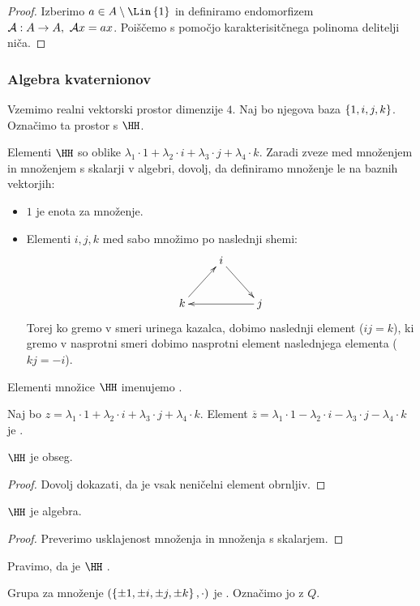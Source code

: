\begin{proof}
    Izberimo $a \in A \setminus \Lin \set{1}$ in definiramo endomorfizem $\mathcal{A}: A \to A, \ \mathcal{A}x = ax$. Poiščemo s pomočjo karakterisitčnega polinoma delitelji niča.
\end{proof}

\subsubsection*{Algebra kvaternionov}
\begin{primer}
    Vzemimo realni vektorski prostor dimenzije $4$. Naj bo njegova baza $\left\{1, i, j, k\right\}$. Označimo ta prostor s $\HH$.
    
    Elementi $\HH$ so oblike $\lambda_1 \cdot 1 + \lambda_2 \cdot i + \lambda_3 \cdot j + \lambda_4 \cdot k$. Zaradi zveze med množenjem in množenjem s skalarji v algebri, dovolj, da definiramo množenje le na baznih vektorjih:
    \begin{itemize}
        \item $1$ je enota za množenje.
        \item Elementi $i, j, k$ med sabo množimo po naslednji shemi:
        $$\xymatrix{
            & i \ar@{->}[rd] &  \\
           k \ar@{->}[ru] &  & j \ar@{->}[ll]
           }$$
        Torej ko gremo v smeri urinega kazalca, dobimo naslednji element ($ij = k$), ki gremo v nasprotni smeri dobimo nasprotni element naslednjega elementa ($kj = -i$).
    \end{itemize}
    Elementi množice $\HH$ imenujemo .

    Naj bo $z = \lambda_1 \cdot 1 + \lambda_2 \cdot i + \lambda_3 \cdot j + \lambda_4 \cdot k$. Element $\overline{z} = \lambda_1 \cdot 1 - \lambda_2 \cdot i - \lambda_3 \cdot j - \lambda_4 \cdot k$ je .    
\end{primer}

\begin{trditev}
    $\HH$ je obseg.
\end{trditev}

\begin{proof}
    Dovolj dokazati, da je vsak neničelni element obrnljiv.
\end{proof}

\begin{trditev}
    $\HH$ je algebra.
\end{trditev}

\begin{proof}
    Preverimo usklajenost množenja in množenja s skalarjem.
\end{proof}

Pravimo, da je $\HH$ . 

Grupa za množenje $(\left\{\pm 1, \pm i, \pm j, \pm k\right\}, \cdot)$ je . Označimo jo z $Q$.

